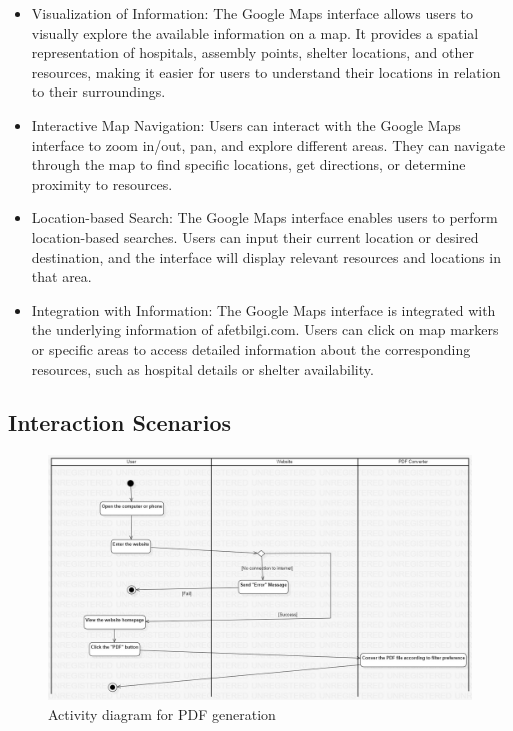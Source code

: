 \documentclass[12pt]{report}
\begin{document}
\begin{itemize}
    \item Visualization of Information: The Google Maps interface allows users to visually explore the available information on a map. It provides a spatial representation of hospitals, assembly points, shelter locations, and other resources, making it easier for users to understand their locations in relation to their surroundings.

    \item Interactive Map Navigation: Users can interact with the Google Maps interface to zoom in/out, pan, and explore different areas. They can navigate through the map to find specific locations, get directions, or determine proximity to resources.

    \item Location-based Search: The Google Maps interface enables users to perform location-based searches. Users can input their current location or desired destination, and the interface will display relevant resources and locations in that area.

    \item Integration with Information: The Google Maps interface is integrated with the underlying information of afetbilgi.com. Users can click on map markers or specific areas to access detailed information about the corresponding resources, such as hospital details or shelter availability.
\end{itemize}

\subsection{Interaction Scenarios}
\begin{figure}[H]
    \includegraphics[scale=0.4]{act1.jpg}
    \centering
    \caption{Activity diagram for PDF generation}
\end{figure}
\end{document}

